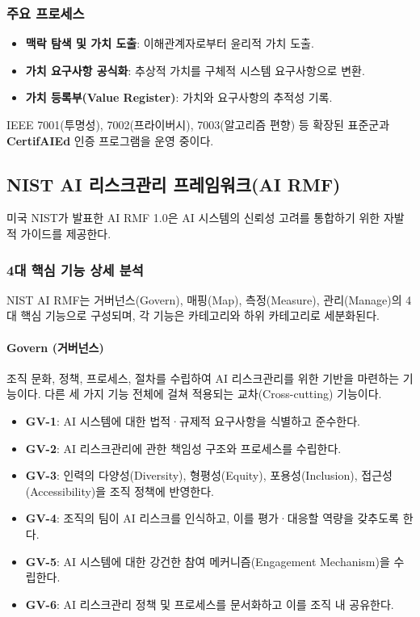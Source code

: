 \subsubsection*{주요 프로세스}
\begin{itemize}
 \item \textbf{맥락 탐색 및 가치 도출}: 이해관계자로부터 윤리적 가치 도출.
 \item \textbf{가치 요구사항 공식화}: 추상적 가치를 구체적 시스템 요구사항으로 변환.
 \item \textbf{가치 등록부(Value Register)}: 가치와 요구사항의 추적성 기록.
\end{itemize}
IEEE 7001(투명성), 7002(프라이버시), 7003(알고리즘 편향) 등 확장된 표준군과 \textbf{CertifAIEd} 인증 프로그램을 운영 중이다.

\subsection{NIST AI 리스크관리 프레임워크(AI RMF)}
미국 NIST가 발표한 AI RMF 1.0은 AI 시스템의 신뢰성 고려를 통합하기 위한 자발적 가이드를 제공한다.\cite{nist2023airmf}

\subsubsection{4대 핵심 기능 상세 분석}

NIST AI RMF는 거버넌스(Govern), 매핑(Map), 측정(Measure), 관리(Manage)의 4대 핵심 기능으로 구성되며, 각 기능은 카테고리와 하위 카테고리로 세분화된다.

\paragraph{Govern (거버넌스)}
조직 문화, 정책, 프로세스, 절차를 수립하여 AI 리스크관리를 위한 기반을 마련하는 기능이다. 다른 세 가지 기능 전체에 걸쳐 적용되는 교차(Cross-cutting) 기능이다.

\begin{itemize}
 \item \textbf{GV-1}: AI 시스템에 대한 법적·규제적 요구사항을 식별하고 준수한다.
 \item \textbf{GV-2}: AI 리스크관리에 관한 책임성 구조와 프로세스를 수립한다.
 \item \textbf{GV-3}: 인력의 다양성(Diversity), 형평성(Equity), 포용성(Inclusion), 접근성(Accessibility)을 조직 정책에 반영한다.
 \item \textbf{GV-4}: 조직의 팀이 AI 리스크를 인식하고, 이를 평가·대응할 역량을 갖추도록 한다.
 \item \textbf{GV-5}: AI 시스템에 대한 강건한 참여 메커니즘(Engagement Mechanism)을 수립한다.
 \item \textbf{GV-6}: AI 리스크관리 정책 및 프로세스를 문서화하고 이를 조직 내 공유한다.
\end{itemize}

